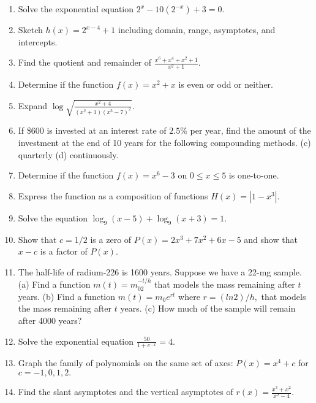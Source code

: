 \documentclass[11pt]{article}
\begin{document}
\begin{enumerate}
\item Solve the exponential equation $2^x-10(2^{-x})+3=0.$

\item Sketch $h(x)=2^{x-4}+1$  including domain, range, asymptotes, and intercepts.

\item Find the quotient and remainder of $\frac{x^6+x^4+x^2+1}{x^2+1}.$

\item Determine if the function $f(x)=x^2+x$ is even or odd or neither.

\item Expand $\log \sqrt{\frac{x^2+4}{(x^2+1)(x^3-7)^2}}.$

\item If \$600 is invested at an interest rate of $2.5\%$ per year, find the amount of the investment at the end of 10 years for the following compounding methods. (c) quarterly (d) continuously.

\item Determine if the function $f(x)=x^6-3$ on $0 \leq x \leq 5$ is one-to-one.

\item Express the function as a composition of functions $H(x)=|1-x^3|.$

\item Solve the equation $\log_9 (x-5) +\log_9 (x+3)=1.$

\item Show that $c=1/2$ is a zero of $P(x)=2x^3+7x^2+6x-5$ and show that $x-c$ is a factor of $P(x).$
\item The half-life of radium-226 is 1600 years. Suppose we have a 22-mg sample. (a) Find a function $m(t)=m_02^{-t/h}$ that models the mass remaining after $t$ years. (b) Find a function $m(t)=m_0e^{rt}$ where $r=(ln 2)/h,$ that models the mass remaining after $t$ years. (c) How much of the sample will remain after 4000 years?\\

\item Solve the exponential equation $\frac{50}{1+e^{-x}}=4.$

\item Graph the family of polynomials on the same set of axes: $P(x)=x^4+c$ for $c=-1,0,1,2.$

\item Find the slant asymptotes and the vertical asymptotes of $r(x)=\frac{x^3+x^2}{x^2-4}.$


\end{enumerate}
\end{document}
